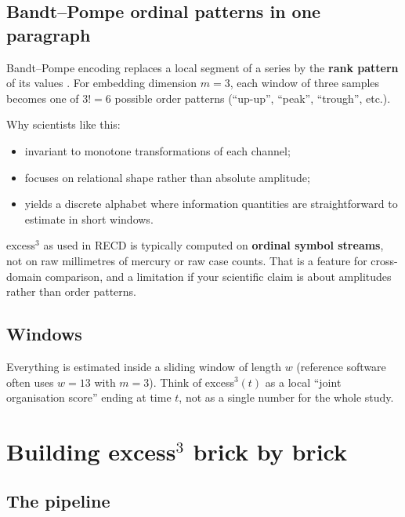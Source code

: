 \documentclass[11pt,a4paper]{article}
\begin{document}
\subsection{Bandt--Pompe ordinal patterns in one paragraph}

Bandt--Pompe encoding replaces a local segment of a series by the
\textbf{rank pattern} of its values \citep{BandtPompe2002}. For embedding
dimension $m=3$, each window of three samples becomes one of $3!=6$
possible order patterns (``up-up'', ``peak'', ``trough'', etc.).

Why scientists like this:
\begin{itemize}[leftmargin=*,itemsep=2pt]
  \item invariant to monotone transformations of each channel;
  \item focuses on relational shape rather than absolute amplitude;
  \item yields a discrete alphabet where information quantities are
  straightforward to estimate in short windows.
\end{itemize}

\begin{keyidea}
excess$^3$ as used in RECD is typically computed on \textbf{ordinal symbol
streams}, not on raw millimetres of mercury or raw case counts. That is a
feature for cross-domain comparison, and a limitation if your scientific
claim is about amplitudes rather than order patterns.
\end{keyidea}

\subsection{Windows}

Everything is estimated inside a sliding window of length $w$ (reference
software often uses $w=13$ with $m=3$). Think of excess$^3(t)$ as a local
``joint organisation score'' ending at time $t$, not as a single number for
the whole study.

\section{Building excess$^3$ brick by brick}
\label{sec:build}

\subsection{The pipeline}
\end{document}
